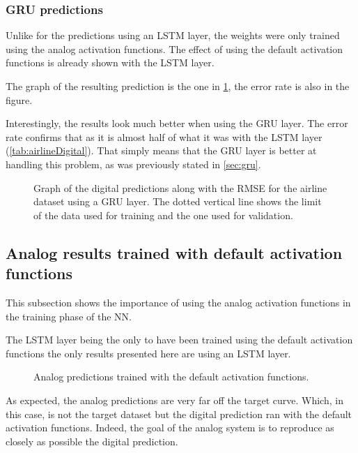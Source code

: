 \subsubsection{\acs{GRU} predictions}

Unlike for the predictions using an \ac{LSTM} layer, the weights were only trained using the analog activation functions. The effect of using the default activation functions is already shown with the \ac{LSTM} layer.

The graph of the resulting prediction is the one in \cref{graph:airlineDigitalGRU}, the error rate is also in the figure.

Interestingly, the results look much better when using the \ac{GRU} layer. The error rate confirms that as it is almost half of what it was with the \ac{LSTM} layer (\cref{tab:airlineDigital}). That simply means that the \ac{GRU} layer is better at handling this problem, as was previously stated in \cref{sec:gru}.

\begin{figure}[H]
  \centering
  
  \caption{Graph of the digital predictions along with the \ac{RMSE} for the airline dataset using a \ac{GRU} layer. The dotted vertical line shows the limit of the data used for training and the one used for validation.}
  \label{graph:airlineDigitalGRU}
\end{figure}

\subsection{Analog results trained with default activation functions}\label{subsec:airlineAnalogNoC}

This subsection shows the importance of using the analog activation functions in the training phase of the \ac{NN}.

The \ac{LSTM} layer being the only to have been trained using the default activation functions the only results presented here are using an \ac{LSTM} layer.

\begin{figure}[H]
  \centering
  
  \caption{Analog predictions trained with the default activation functions.}
  \label{graph:airlineAnalogNoC}
\end{figure}

As expected, the analog predictions are very far off the target curve. Which, in this case, is not the target dataset but the digital prediction ran with the default activation functions. Indeed, the goal of the analog system is to reproduce as closely as possible the digital prediction.

